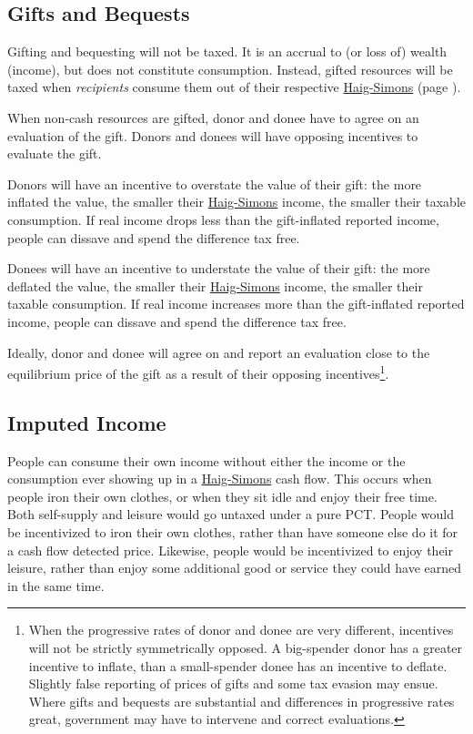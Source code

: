 \subsection{Gifts and Bequests} Gifting and bequesting will not be taxed. It is an accrual to (or loss of) wealth (income), but does not constitute consumption. Instead, gifted resources will be taxed when \emph{recipients} consume them out of their respective \hyperref[eq:HaigSimonsPCT]{Haig-Simons} (page \pageref{eq:HaigSimonsPCT}).

When non-cash resources are gifted, donor and donee have to agree on an evaluation of the gift. Donors and donees will have opposing incentives to evaluate the gift.

Donors will have an incentive to overstate the value of their gift: the more inflated the value, the smaller their \hyperref[eq:HaigSimonsPCT]{Haig-Simons} income, the smaller their taxable consumption. If real income drops less than the gift-inflated reported income, people can dissave and spend the difference tax free.

Donees will have an incentive to understate the value of their gift: the more deflated the value, the smaller their \hyperref[eq:HaigSimonsPCT]{Haig-Simons} income, the smaller their taxable consumption. If real income increases more than the gift-inflated reported income, people can dissave and spend the difference tax free.

Ideally, donor and donee will agree on and report an evaluation close to the equilibrium price of the gift as a result of their opposing incentives\footnote{
	When the progressive rates of donor and donee are very different, incentives will not be strictly symmetrically opposed. A big-spender donor has a greater incentive to inflate, than a small-spender donee has an incentive to deflate. Slightly false reporting of prices of gifts and some tax evasion may ensue. Where gifts and bequests are substantial and differences in progressive rates great, government may have to intervene and correct evaluations.}.

\subsection{Imputed Income} People can consume their own income without either the income or the consumption ever showing up in a \hyperref[eq:HaigSimonsPCT]{Haig-Simons} cash flow. This occurs when people iron their own clothes, or when they sit idle and enjoy their free time. Both self-supply and leisure would go untaxed under a pure PCT. People would be incentivized to iron their own clothes, rather than have someone else do it for a cash flow detected price. Likewise, people would be incentivized to enjoy their leisure, rather than enjoy some additional good or service they could have earned in the same time.

